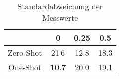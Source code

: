 \bgroup
\def\arraystretch{2}
\begin{table}[H]
	\vspace{.5cm}
	\centering		
	\begin{center}
		\begin{tabular}{|c||c|c|c|}
			\hline 
			& 0 & 0.25 & 0.5 \\
			\hline 
			\hline
			Zero-Shot & 21.6 & 12.8 & 18.3 \\
			\hline
			One-Shot & \textbf{10.7} & 20.0 & 19.1 \\
			\hline
		\end{tabular} 
	\end{center}
	\caption{Standardabweichung der Messwerte}
	\label{fig:branch-var}
	\vspace{-.8cm}
\end{table}
\egroup